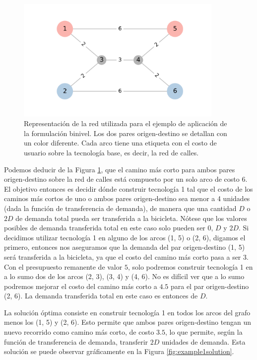 \begin{figure}[h!]
  \centering
  \includegraphics[width=10cm]{../resources/example_1_base.png}
  \caption{Representación de la red utilizada para el ejemplo de aplicación de la formulación binivel. Los dos pares origen-destino se detallan con un color diferente. Cada arco tiene una etiqueta con el costo de usuario sobre la tecnología base, es decir, la red de calles.}
  \label{fig:example1base}
\end{figure}

Podemos deducir de la Figura \ref{fig:example1base}, que el camino más corto para ambos pares origen-destino sobre la red de calles está compuesto por un solo arco de costo 6. El objetivo entonces es decidir dónde construir tecnología 1 tal que el costo de los caminos más cortos de uno o ambos pares origen-destino sea menor a 4 unidades (dada la función de transferencia de demanda), de manera que una cantidad $D$ o $2D$ de demanda total pueda ser transferida a la bicicleta. Nótese que los valores posibles de demanda transferida total en este caso solo pueden ser $0$, $D$ y $2D$. Si decidimos utilizar tecnología 1 en alguno de los arcos (1, 5) o (2, 6), digamos el primero, entonces nos aseguramos que la demanda del par origen-destino (1, 5) será transferida a la bicicleta, ya que el costo del camino más corto pasa a ser $3$. Con el presupuesto remanente de valor $5$, solo podremos construir tecnología 1 en a lo sumo dos de los arcos (2, 3), (3, 4) y (4, 6). No es difícil ver que a lo sumo podremos mejorar el costo del camino más corto a $4.5$ para el par origen-destino (2, 6). La demanda transferida total en este caso es entonces de $D$.

La solución óptima consiste en construir tecnología 1 en todos los arcos del grafo menos los (1, 5) y (2, 6). Esto permite que ambos pares origen-destino tengan un nuevo recorrido como camino más corto, de costo $3.5$, lo que permite, según la función de transferencia de demanda, transferir $2D$ unidades de demanda. Esta solución se puede observar gráficamente en la Figura \ref{fig:example1solution}.

